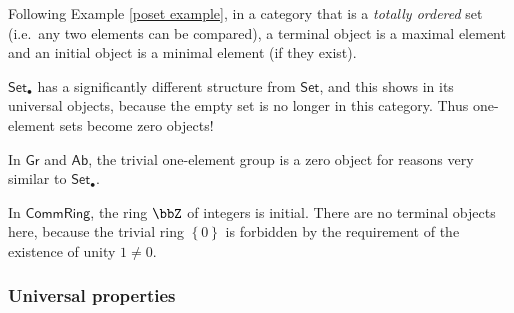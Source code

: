 \begin{example}
Following Example \ref{poset example}, in a category that is a \emph{totally ordered} set (i.e.\ any two elements can be compared), a terminal object is a maximal element and an initial object is a minimal element (if they exist).
\end{example}
%
\begin{example}
$\mathsf{Set}_{\bullet}$ has a significantly different structure
from $\mathsf{Set}$, and this shows in its universal objects, because
the empty set is no longer in this category. Thus one-element sets
become zero objects!
\end{example}
%
\begin{example}
In $\mathsf{Gr}$ and $\mathsf{Ab}$, the trivial one-element group
is a zero object for reasons very similar to $\mathsf{Set}_{\bullet}$.
\end{example}
%
\begin{example}
In $\mathsf{CommRing}$, the ring $\bbZ$ of integers is initial.
There are no terminal objects here, because the trivial ring $\left\{ 0\right\} $
is forbidden by the requirement of the existence of unity $1\neq0$.
\end{example}
%

\subsubsection{Universal properties}

